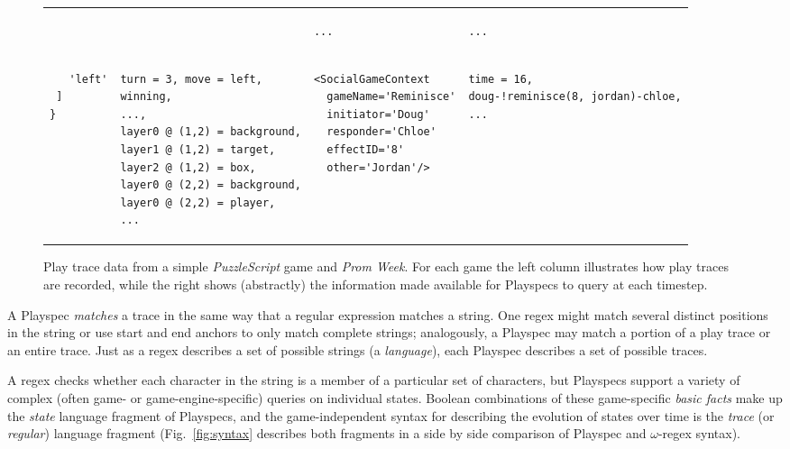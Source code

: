 \documentclass[letterpaper]{article}
\begin{document}
\begin{figure*}[t]
\begin{tabular}{ p{0.7in}  p{1.4in} | p{1.6in}  p{2.3in} }
& 

&
\begin{verbatim}...\end{verbatim}
&
\begin{verbatim}...\end{verbatim}
\\ [-4ex]
\begin{verbatim}   'left'
 ]
}\end{verbatim}
&
\begin{verbatim}turn = 3, move = left, 
winning, 
...,
layer0 @ (1,2) = background,
layer1 @ (1,2) = target,
layer2 @ (1,2) = box,
layer0 @ (2,2) = background,
layer0 @ (2,2) = player,
...\end{verbatim}
&
\begin{verbatim}<SocialGameContext 
  gameName='Reminisce'
  initiator='Doug'
  responder='Chloe'
  effectID='8'
  other='Jordan'/>
\end{verbatim}
&
\begin{verbatim}time = 16,
doug-!reminisce(8, jordan)-chloe,
...\end{verbatim}
\\ \hline
\end{tabular}
\caption{Play trace data from a simple \emph{PuzzleScript} game and \emph{Prom Week}. For each game the left column illustrates how play traces are recorded, while the right shows (abstractly) the information made available for Playspecs to query at each timestep.}
\label{fig:traces}
\end{figure*}

A Playspec \emph{matches} a trace in the same way that a regular expression matches a string. One regex might match several distinct positions in the string or use start and end anchors to only match complete strings; analogously, a Playspec may match a portion of a play trace or an entire trace. Just as a regex describes a set of possible strings (a \emph{language}), each Playspec describes a set of possible traces.

A regex checks whether each character in the string is a member of a particular set of characters, but Playspecs support a variety of complex (often game- or game-engine-specific) queries on individual states. Boolean combinations of these game-specific \emph{basic facts} make up the \emph{state} language fragment of Playspecs, and the game-independent syntax for describing the evolution of states over time is the \emph{trace} (or \emph{regular}) language fragment (Fig.~\ref{fig:syntax} describes both fragments in a side by side comparison of Playspec and  $\omega$-regex syntax).
\end{document}
